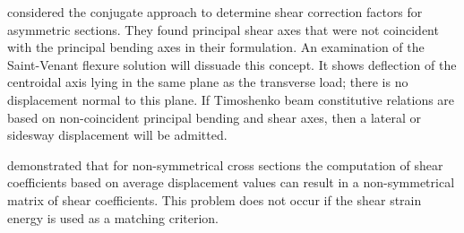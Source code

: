 \begin{Quote}
    \cite{schramm1994shear} considered the conjugate approach to determine shear correction factors for asymmetric sections. 
    They found principal shear axes that were not coincident with the principal bending axes in their formulation. 
    An examination of the Saint-Venant flexure solution will dissuade this concept. 
    It shows deflection of the centroidal axis lying in the same plane as the transverse load; there is no displacement normal to this plane. 
    If Timoshenko beam constitutive relations are based on non-coincident principal bending and shear axes, then a lateral or sidesway displacement will be admitted.
    
    \cite{schramm1994shear} demonstrated that for non-symmetrical cross sections the computation of shear coefficients based on average displacement values can result in a non-symmetrical matrix of shear coefficients. 
    This problem does not occur if the shear strain energy is used as a matching criterion. 
  \end{Quote}


